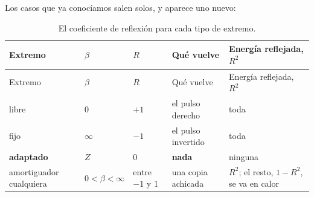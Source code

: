 \documentclass[
  spanish,
  a4paper,
]{scrbook}
\theoremstyle{definition}
\theoremstyle{plain}
\theoremstyle{definition}
\theoremstyle{plain}
\theoremstyle{definition}
\theoremstyle{remark}
\begin{document}
Los casos que ya conocíamos salen solos, y aparece uno nuevo:

\begin{longtable}[]{@{}
  >{\raggedright\arraybackslash}p{}
  >{\raggedright\arraybackslash}p{}
  >{\raggedright\arraybackslash}p{}
  >{\raggedright\arraybackslash}p{}
  >{\raggedright\arraybackslash}p{}@{}}
\caption{El coeficiente de reflexión para cada tipo de
extremo.}\label{tbl-hip-reflexion}\tabularnewline
\toprule\noalign{}
\begin{minipage}[b]{\linewidth}\raggedright
Extremo
\end{minipage} & \begin{minipage}[b]{\linewidth}\raggedright
\(\beta\)
\end{minipage} & \begin{minipage}[b]{\linewidth}\raggedright
\(R\)
\end{minipage} & \begin{minipage}[b]{\linewidth}\raggedright
Qué vuelve
\end{minipage} & \begin{minipage}[b]{\linewidth}\raggedright
Energía reflejada, \(R^2\)
\end{minipage} \\
\midrule\noalign{}
\endfirsthead
\toprule\noalign{}
\begin{minipage}[b]{\linewidth}\raggedright
Extremo
\end{minipage} & \begin{minipage}[b]{\linewidth}\raggedright
\(\beta\)
\end{minipage} & \begin{minipage}[b]{\linewidth}\raggedright
\(R\)
\end{minipage} & \begin{minipage}[b]{\linewidth}\raggedright
Qué vuelve
\end{minipage} & \begin{minipage}[b]{\linewidth}\raggedright
Energía reflejada, \(R^2\)
\end{minipage} \\
\midrule\noalign{}
\endhead
\bottomrule\noalign{}
\endlastfoot
libre & \(0\) & \(+1\) & el pulso derecho & toda \\
fijo & \(\infty\) & \(-1\) & el pulso invertido & toda \\
\textbf{adaptado} & \(Z\) & \(0\) & \textbf{nada} & ninguna \\
amortiguador cualquiera & \(0<\beta<\infty\) & entre \(-1\) y \(1\) &
una copia achicada & \(R^2\); el resto, \(1-R^2\), se va en calor \\
\end{longtable}
\end{document}
